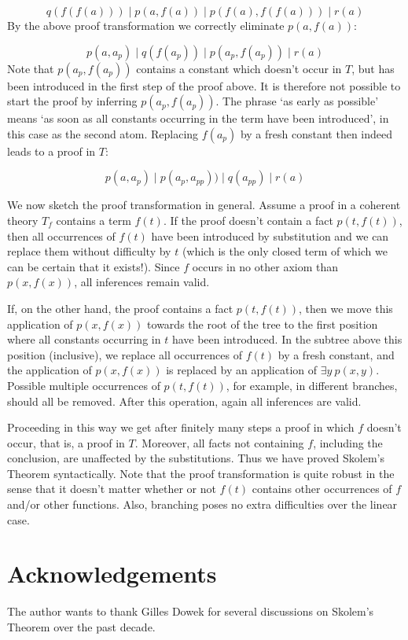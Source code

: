 \documentclass[12pt]{article}
\newcommand{\Tf}{T_{\!f}}
\begin{document}
\[q(f(f(a))) \mid p(a,f(a)) \mid p(f(a),f(f(a))) \mid r(a) \] 
By the above proof transformation we correctly eliminate $p(a,f(a))$:

\[p(a,a_p) \mid q(f(a_p)) \mid p(a_p,f(a_p)) \mid r(a) \] 
Note that $p(a_p,f(a_p))$ contains a constant which doesn't occur
in $T$, but has been introduced in the first step of the proof above.
It is therefore not possible to start the proof by inferring $p(a_p,f(a_p))$.
The phrase `as early as possible' means `as soon as all constants occurring
in the term have been introduced', in this case as the second atom.
Replacing $f(a_p)$ by a fresh constant then indeed leads to a proof in $T$:

\[p(a,a_p) \mid p(a_p,a_{pp})) \mid q(a_{pp}) \mid r(a) \] 

We now sketch the proof transformation in general.
Assume a proof in a coherent theory $\Tf$ contains a term $f(t)$.
If the proof doesn't contain a fact $p(t,f(t))$,
then all occurrences of $f(t)$ have been introduced
by substitution and we can replace them without difficulty
by $t$ (which is the only closed term of which we can
be certain that it exists!).
Since $f$ occurs in no other axiom than $p(x,f(x))$,
all inferences remain valid. 

If, on the other hand, the proof contains a fact $p(t,f(t))$,
then we move this application of $p(x,f(x))$ towards the root
of the tree to the first position where all constants
occurring in $t$ have been introduced. In the subtree above
this position (inclusive), we replace all occurrences of $f(t)$
by a fresh constant, and the application of $p(x,f(x))$ is
replaced by an application of $\exists y~p(x,y)$. Possible
multiple occurrences of $p(t,f(t))$, for example, in different
branches, should all be removed. After this operation, again all
inferences are valid.  

Proceeding in this way we get after finitely many steps
a proof in which $f$ doesn't occur, that is, a proof in $T$.
Moreover, all facts not containing $f$, including the conclusion,
are unaffected by the substitutions.
Thus we have proved Skolem's Theorem syntactically.
Note that the proof transformation is quite robust in the sense
that it doesn't matter whether or not $f(t)$ contains
other occurrences of $f$ and/or other functions.
Also, branching poses no extra difficulties over the linear case.

\section*{Acknowledgements}
The author wants to thank Gilles Dowek for several discussions
on Skolem's Theorem over the past decade.
\end{document}
